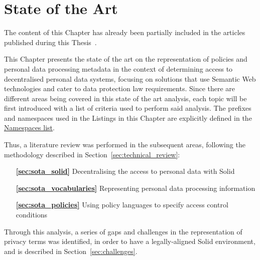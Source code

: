 \chapter{State of the Art}
\label{chap:sota}

\begin{tcolorbox}[colback=royallavender!40]
The content of this Chapter has already been partially included in the articles published during this Thesis~\citep{esteves_odrl_2021,esteves_analysis_2022,asgarinia_who_2023,esteves_using_2023,florea_is_2023}.
\end{tcolorbox}

This Chapter presents the state of the art on the representation of policies and personal data processing metadata in the context of determining access to decentralised personal data systems, focusing on solutions that use Semantic Web technologies and cater to data protection law requirements.
Since there are different areas being covered in this state of the art analysis, each topic will be first introduced with a list of criteria used to perform said analysis.
The prefixes and namespaces used in the Listings in this Chapter are explicitly defined in the \hyperref[sec:namespaces]{Namespaces list}.

Thus, a literature review was performed in the subsequent areas, following the methodology described in Section~\ref{sec:technical_review}:

\begin{itemize}
    \item [\textbf{\ref{sec:sota_solid}}] Decentralising the access to personal data with Solid
    \item [\textbf{\ref{sec:sota_vocabularies}}] Representing personal data processing information
    \item [\textbf{\ref{sec:sota_policies}}] Using policy languages to specify access control conditions
\end{itemize}

Through this analysis, a series of gaps and challenges in the representation of privacy terms was identified, in order to have a legally-aligned Solid environment, and is described in Section~\ref{sec:challenges}.





